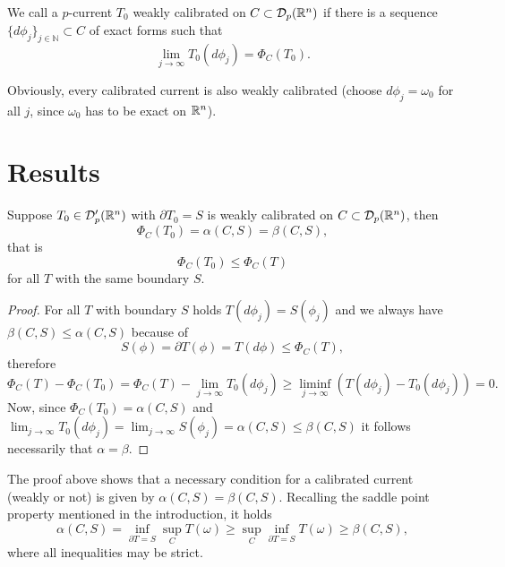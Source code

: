 \documentclass[11pt,a4paper]{article}
\begin{document}
\begin{definition}
We call a $p$-current $T_0$ weakly calibrated on $C\subset {{\cal D}}_p(\mathbb{R}^n)$ if there is
a sequence $\{d\phi_j\}_{j\in{\mathbb N}}\subset C$ of exact forms such that
\[
    \lim_{j\rightarrow\infty} T_0(d\phi_j)=\Phi_C(T_0).
\]
\end{definition} 
Obviously, every calibrated current is also weakly calibrated (choose $d\phi_j=\omega_0$ for
all $j$, since $\omega_0$ has to be exact on $\mathbb{R}^n$). 

\newpage
\section{Results}
\begin{proposition}
Suppose $T_0\in {{\cal D}}'_p(\mathbb{R}^n)$ with $\partial T_0=S$ is weakly calibrated on 
 $C\subset {{\cal D}}_p(\mathbb{R}^n)$, then
 \begin{equation}
   \Phi_C(T_0)=\alpha(C,S)=\beta(C,S),
 \end{equation}
that is
\[
    \Phi_C(T_0) \leq \Phi_C(T)
\]
for all $T$ with the same boundary $S$.
\end{proposition}
\begin{proof}
For all $T$ with boundary $S$ holds $T(d\phi_j)=S(\phi_j)$ and we always have 
$\beta(C,S)\leq \alpha(C,S)$ because of
\[
       S(\phi)=\partial T(\phi)=T(d\phi)\leq \Phi_C(T),
\]
therefore
  $$\Phi_C(T)-\Phi_C(T_0)=\Phi_C(T) - \lim_{j\rightarrow\infty}T_0(d\phi_j)
  \geq \liminf_{j\rightarrow\infty}(T(d\phi_j)-T_0(d\phi_j))=0.$$
Now, since $\Phi_C(T_0)=\alpha(C,S)$ and 
$\lim_{j\rightarrow\infty}T_0(d\phi_j)=\lim_{j\rightarrow\infty}S(\phi_j)=\alpha(C,S)
\leq \beta(C,S)$ it follows necessarily that $\alpha=\beta.$
\end{proof}

The proof above shows that a necessary condition for a calibrated current (weakly or not) is
given by $\alpha(C,S)=\beta(C,S)$. Recalling the saddle point property mentioned in the 
introduction, it holds
\[
   \alpha(C,S)= \inf_{\partial T=S} \sup_C T(\omega) 
   \geq \sup_C\inf_{\partial T=S} T(\omega)\geq \beta(C,S),
\]
where all inequalities may be strict.
\end{document}
